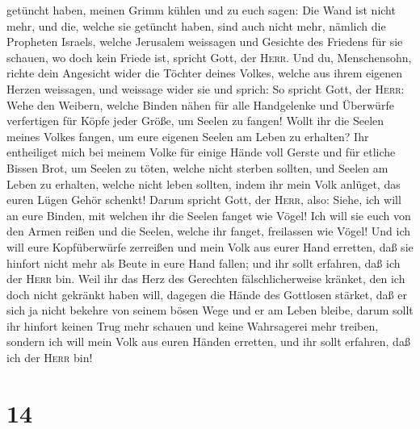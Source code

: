 getüncht haben, meinen Grimm kühlen und zu euch sagen: Die Wand ist
nicht mehr, und die, welche sie getüncht haben, sind auch nicht mehr,
 nämlich die Propheten Israels, welche Jerusalem
weissagen und Gesichte des Friedens für sie schauen, wo doch kein Friede
ist, spricht Gott, der \textsc{Herr}.  Und du,
Menschensohn, richte dein Angesicht wider die Töchter deines Volkes,
welche aus ihrem eigenen Herzen weissagen, und weissage wider sie und
sprich:  So spricht Gott, der \textsc{Herr}: Wehe den
Weibern, welche Binden nähen für alle Handgelenke und Überwürfe
verfertigen für Köpfe jeder Größe, um Seelen zu fangen! Wollt ihr die
Seelen meines Volkes fangen, um eure eigenen Seelen am Leben zu
erhalten?  Ihr entheiliget mich bei meinem Volke für
einige Hände voll Gerste und für etliche Bissen Brot, um Seelen zu
töten, welche nicht sterben sollten, und Seelen am Leben zu erhalten,
welche nicht leben sollten, indem ihr mein Volk anlüget, das euren Lügen
Gehör schenkt!  Darum spricht Gott, der \textsc{Herr},
also: Siehe, ich will an eure Binden, mit welchen ihr die Seelen fanget
wie Vögel! Ich will sie euch von den Armen reißen und die Seelen, welche
ihr fanget, freilassen wie Vögel!  Und ich will eure
Kopfüberwürfe zerreißen und mein Volk aus eurer Hand erretten, daß sie
hinfort nicht mehr als Beute in eure Hand fallen; und ihr sollt
erfahren, daß ich der \textsc{Herr} bin.  Weil ihr das
Herz des Gerechten fälschlicherweise kränket, den ich doch nicht
gekränkt haben will, dagegen die Hände des Gottlosen stärket, daß er
sich ja nicht bekehre von seinem bösen Wege und er am Leben bleibe,
 darum sollt ihr hinfort keinen Trug mehr schauen und
keine Wahrsagerei mehr treiben, sondern ich will mein Volk aus euren
Händen erretten, und ihr sollt erfahren, daß ich der \textsc{Herr} bin!

\hypertarget{section-13}{%
\section{14}\label{section-13}}


